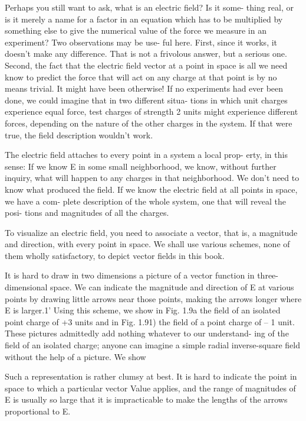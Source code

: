 Perhaps you still want to ask, what is an electric field? Is it some-
thing real, or is it merely a name for a factor in an equation which has
to be multiplied by something else to give the numerical value of the
force we measure in an experiment? Two observations may be use-
ful here. First, since it works, it doesn't make any difference. That
is not a frivolous answer, but a serious one. Second, the fact that
the electric field vector at a point in space is all we need know to
predict the force that will act on any charge at that point is by no
means trivial. It might have been otherwise! If no experiments
had ever been done, we could imagine that in two different situa-
tions in which unit charges experience equal force, test charges of
strength 2 units might experience different forces, depending on the
nature of the other charges in the system. If that were true, the field
description wouldn't work.

The electric field attaches to every point in a system a local prop-
erty, in this sense: If we know E in some small neighborhood, we
know, without further inquiry, what will happen to any charges in
that neighborhood. We don't need to know what produced the field.
If we know the electric field at all points in space, we have a com-
plete description of the whole system, one that will reveal the posi-
tions and magnitudes of all the charges.

To visualize an electric field, you need to associate a vector, that is,
a magnitude and direction, with every point in space. We shall use
various schemes, none of them wholly satisfactory, to depict vector
fields in this book.

It is hard to draw in two dimensions a picture of a vector function
in three-dimensional space. We can indicate the magnitude and
direction of E at various points by drawing little arrows near those
points, making the arrows longer where E is larger.1' Using this
scheme, we show in Fig. 1.9a the field of an isolated point charge of
+3 units and in Fig. 1.91) the field of a point charge of -- 1 unit.
These pictures admittedly add nothing whatever to our understand-
ing of the field of an isolated charge; anyone can imagine a simple
radial inverse-square field without the help of a picture. We show

Such a representation is rather clumsy at best. It is hard to indicate the point in
space to which a particular vector Value applies, and the range of magnitudes of E is
usually so large that it is impracticable to make the lengths of the arrows proportional
to E.

